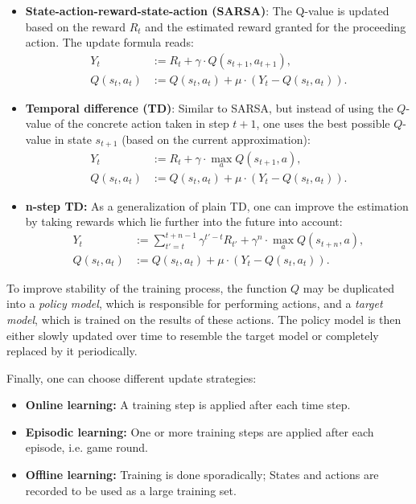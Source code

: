 \documentclass{article}
\begin{document}
\begin{itemize}
    \item \textbf{State-action-reward-state-action (SARSA)}: The Q-value is updated based on the reward $R_{t}$ and the estimated reward granted for the proceeding action. The update formula reads:
    \begin{align*}
        Y_t &:= R_t + \gamma \cdot Q(s_{t+1}, a_{t+1}),\\
        Q(s_t, a_t) &:= Q(s_t, a_t) + \mu \cdot \left(Y_t - Q(s_t, a_t)\right).
    \end{align*}

    \item \textbf{Temporal difference (TD)}: Similar to SARSA, but instead of using the $Q$-value of the concrete action taken in step $t+1$, one uses the best possible $Q$-value in state $s_{t+1}$ (based on the current approximation):
    \begin{align*}
        Y_t &:= R_t + \gamma \cdot \max_a Q(s_{t+1}, a),\\
        Q(s_t, a_t) &:= Q(s_t, a_t) + \mu \cdot \left(Y_t - Q(s_t, a_t)\right).
    \end{align*}

    \item \textbf{n-step TD:} As a generalization of plain TD, one can improve the estimation by taking rewards which lie further into the future into account:
    \begin{align*}
        Y_t &:= \sum_{t' = t}^{t+n-1} \gamma^{t'-t} R_{t'} + \gamma^n \cdot \max_a Q(s_{t+n}, a),\\
        Q(s_t, a_t) &:= Q(s_t, a_t) + \mu \cdot \left(Y_t - Q(s_t, a_t)\right).
    \end{align*}
\end{itemize}

To improve stability of the training process, the function $Q$ may be duplicated into a \textit{policy model}, which is responsible for performing actions, and a \textit{target model}, which is trained on the results of these actions. The policy model is then either slowly updated over time to resemble the target model or completely replaced by it periodically.

\clearpage

Finally, one can choose different update strategies:

\begin{itemize}
    \item \textbf{Online learning:} A training step is applied after each time step.
    \item \textbf{Episodic learning:} One or more training steps are applied after each episode, i.e. game round.
    \item \textbf{Offline learning:} Training is done sporadically; States and actions are recorded to be used as a large training set.
\end{itemize}
\end{document}
